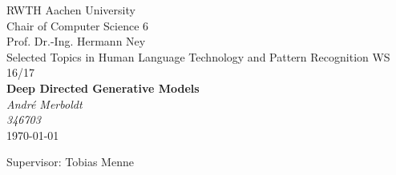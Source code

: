 \documentclass[twoside,11pt,a4paper]{article}
\theoremstyle{break}
\begin{document}
\pagestyle{empty}

\begin{center}

    RWTH Aachen University\\
    Chair of Computer Science 6 \\
    Prof. Dr.-Ing. Hermann Ney\\[6ex]
    Selected Topics in Human Language Technology and Pattern Recognition WS 16/17\\[12ex]

    \LARGE
    \textbf{Deep Directed Generative Models} \\[6ex]
    \textit{André Merboldt} \\[6ex]
    \textit{346703} \\[6ex]
    \today

    \vfill
    \Large Supervisor: Tobias Menne
\end{center}

\newpage
\
\newpage


\pagestyle{headings}
\tableofcontents
\listoftables
\listoffigures
\newpage
\pagestyle{headings}































\end{document}
